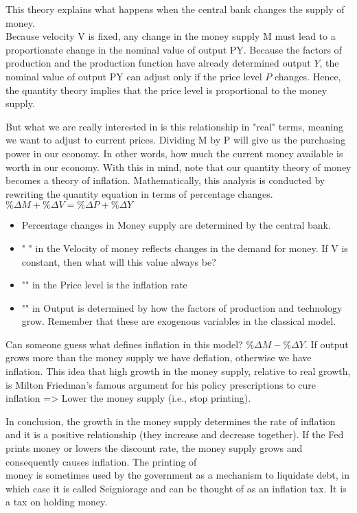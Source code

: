 \documentclass[10pt]{article}
\begin{document}
This theory explains what happens when the central bank changes the supply of money.\\
Because velocity V is fixed, any change in the money supply M must lead to a proportionate change in the nominal value of output PY. Because the factors of production and the production function have already determined output $Y$, the nominal value of output PY can adjust only if the price level $P$ changes. Hence, the quantity theory implies that the price level is proportional to the money supply.

But what we are really interested in is this relationship in "real" terms, meaning we want to adjust to current prices. Dividing M by P will give us the purchasing power in our economy. In other words, how much the current money available is worth in our economy. With this in mind, note that our quantity theory of money becomes a theory of inflation. Mathematically, this analysis is conducted by rewriting the quantity equation in terms of percentage changes.\\
$\% \Delta M+\% \Delta V=\% \Delta P+\% \Delta Y$

\begin{itemize}
  \item Percentage changes in Money supply are determined by the central bank.
  \item " " in the Velocity of money reflects changes in the demand for money. If V is constant, then what will this value always be?
  \item "" in the Price level is the inflation rate
  \item "" in Output is determined by how the factors of production and technology grow. Remember that these are exogenous variables in the classical model.
\end{itemize}

Can someone guess what defines inflation in this model? $\% \Delta M-\% \Delta Y$. If output grows more than the money supply we have deflation, otherwise we have inflation. This idea that high growth in the money supply, relative to real growth, is Milton Friedman's famous argument for his policy prescriptions to cure inflation => Lower the money supply (i.e., stop printing).

In conclusion, the growth in the money supply determines the rate of inflation and it is a positive relationship (they increase and decrease together). If the Fed prints money or lowers the discount rate, the money supply grows and consequently causes inflation. The printing of\\
money is sometimes used by the government as a mechanism to liquidate debt, in which case it is called Seigniorage and can be thought of as an inflation tax. It is a tax on holding money.
\end{document}
